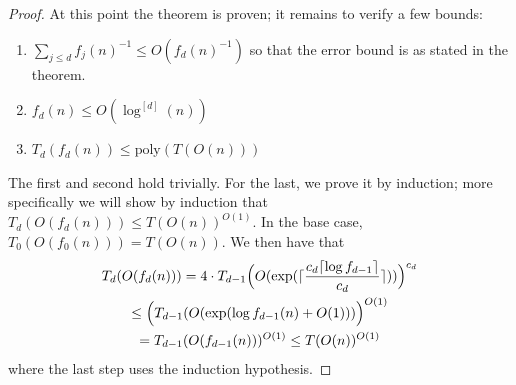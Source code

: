 \documentclass[11pt]{article}
\renewcommand{\poly}{\mathrm{poly}}
\begin{document}
\begin{proof}
At this point the theorem is proven; it remains to verify a few bounds:
\begin{enumerate}
    \item $\sum_{j \leq d} f_j(n)^{-1} \leq O(f_d(n)^{-1})$ so that the error bound is as stated in the theorem.
    \item $f_d(n) \leq O(\log^{[d]}(n))$
    \item $T_d(f_d(n)) \leq \poly(T(O(n)))$
\end{enumerate}
The first and second hold trivially. For the last, we prove it by induction; more specifically we will show by induction that $T_d(O(f_d(n))) \leq T(O(n))^{O(1)}$. In the base case, $T_0(O(f_0(n))) = T(O(n))$. We then have that
\begin{gather}
T_d(O(f_d(n))) = 4 \cdot T_{d-1}\Bigl(O(\exp(\lceil \frac{c_d \lceil \log f_{d-1} \rceil }{c_d} \rceil ))\Bigr)^{c_d} \\\leq  \Bigl(T_{d-1}(O(\exp( \log f_{d-1}(n) + O(1)))\Bigr)^{O(1)} \\= T_{d-1}(O(f_{d-1}(n)))^{O(1)} \leq T(O(n))^{O(1)}
\end{gather}
where the last step uses the induction hypothesis.
\end{proof}
\end{document}
